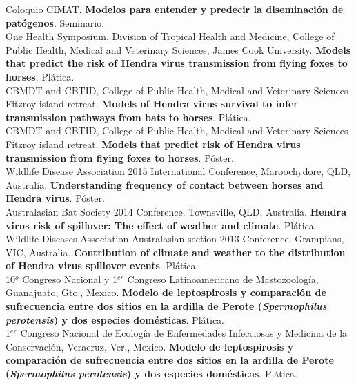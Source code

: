 \documentclass[11pt, letter]{article}
\newcommand{\years}[1]{\marginnote{\scriptsize #1}}
\begin{document}
\years{2017} Coloquio CIMAT. \textbf{Modelos para entender y predecir la diseminaci\'on de pat\'ogenos}. Seminario.\\

\years{2016} One Health Symposium. Division of Tropical Health and Medicine, College of Public Health, Medical and Veterinary Sciences, James Cook University. \textbf{Models that predict the risk of Hendra virus transmission from flying foxes to horses}. Pl\'atica.\\

\years{2016} CBMDT and CBTID, College of Public Health, Medical and Veterinary Sciences Fitzroy island retreat. \textbf{Models of Hendra virus survival to infer transmission pathways from bats to horses}. Pl\'atica.\\

\years{2016} CBMDT and CBTID, College of Public Health, Medical and Veterinary Sciences Fitzroy island retreat. \textbf{Models that predict risk of Hendra virus transmission from flying foxes to horses}. P\'oster.\\

\years{2015} Wildlife Disease Association 2015 International Conference, Maroochydore, QLD, Australia. \textbf{Understanding frequency of contact between horses and Hendra virus}. P\'oster.\\

\years{2014} Australasian Bat Society 2014 Conference. Townsville, QLD, Australia. \textbf{Hendra virus risk of spillover: The effect of weather and climate}. Pl\'atica.\\

\years{2013} Wildlife Diseases Association Australasian section 2013 Conference. Grampians, VIC, Australia. \textbf{Contribution of climate and weather to the distribution of Hendra virus spillover events}. Pl\'atica.\\

\years{2010} 10$^o$ Congreso Nacional y 1$^{er}$ Congreso Latinoamericano de Mastozoolog\'ia, Guanajuato, Gto., Mexico. \textbf{Modelo de leptospirosis y comparaci\'on de sufrecuencia entre dos sitios en la ardilla de Perote (\emph{Spermophilus 
		perotensis}) y dos especies dom\'esticas}. Pl\'atica.\\

\years{2009} 1$^{er}$ Congreso Nacional de Ecolog\'ia de Enfermedades Infecciosas y Medicina de la Conservaci\'on, Veracruz, Ver., Mexico. \textbf{Modelo de leptospirosis y comparaci\'on de sufrecuencia entre dos sitios en la ardilla de Perote (\emph{Spermophilus perotensis}) y dos especies dom\'esticas}. Pl\'atica.\\
\end{document}
